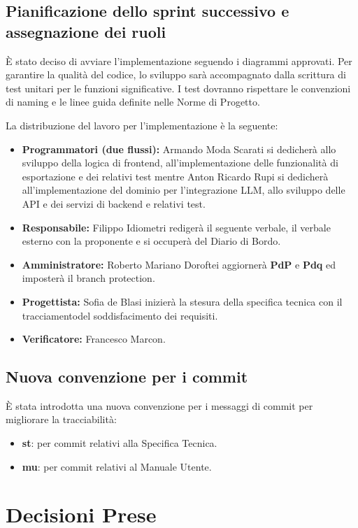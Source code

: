 \subsection{Pianificazione dello sprint successivo e assegnazione dei ruoli}
È stato deciso di avviare l'implementazione seguendo i diagrammi approvati. 
Per garantire la qualità del codice, lo sviluppo sarà accompagnato dalla scrittura di test unitari per le funzioni significative. 
I test dovranno rispettare le convenzioni di naming e le linee guida definite nelle Norme di Progetto.

La distribuzione del lavoro per l'implementazione è la seguente:
\begin{itemize}
	\item \textbf{Programmatori (due flussi):} Armando Moda Scarati si dedicherà allo sviluppo della logica di frontend, all'implementazione 
	delle funzionalità di esportazione e dei relativi test mentre Anton Ricardo Rupi si dedicherà all'implementazione del dominio per 
	l'integrazione LLM, allo sviluppo delle API e dei servizi di backend e relativi test.
	\item \textbf{Responsabile:} Filippo Idiometri redigerà il seguente verbale, il verbale esterno con la proponente e 
	si occuperà del Diario di Bordo.
	\item \textbf{Amministratore:} Roberto Mariano Doroftei aggiornerà \textbf{PdP} e \textbf{Pdq} ed imposterà il branch protection.
	\item \textbf{Progettista:} Sofia de Blasi inizierà la stesura della specifica tecnica con il tracciamentodel soddisfacimento dei requisiti.
	\item \textbf{Verificatore:} Francesco Marcon.
\end{itemize}

\subsection{Nuova convenzione per i commit}
È stata introdotta una nuova convenzione per i messaggi di commit per migliorare la tracciabilità:
\begin{itemize}
    \item \textbf{st}: per commit relativi alla Specifica Tecnica.
    \item \textbf{mu}: per commit relativi al Manuale Utente.
\end{itemize}
\section{Decisioni Prese}

